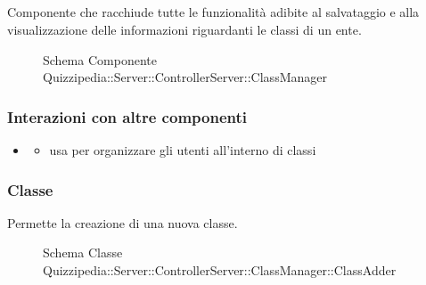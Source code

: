 \subsection{}
Componente che racchiude tutte le funzionalità adibite al salvataggio e alla visualizzazione delle informazioni riguardanti le classi di un ente.
\begin{figure}[H]
\centering
\noindent{}
\caption[Schema Componente Quizzipedia::Server::ControllerServer::ClassManager]{Schema Componente Quizzipedia::Server::ControllerServer::ClassManager}
\end{figure}
\subsubsection{Interazioni con altre componenti}
\begin{itemize}
\item {}
\begin{itemize}
\item usa  per organizzare gli utenti all'interno di classi
\end{itemize}
\end{itemize}
\subsubsection{Classe }
Permette la creazione di una nuova classe.
\begin{figure}[H]
\centering
\noindent{}
\caption[Schema Classe ClassAdder]{Schema Classe Quizzipedia::Server::ControllerServer::ClassManager::ClassAdder}
\end{figure}
